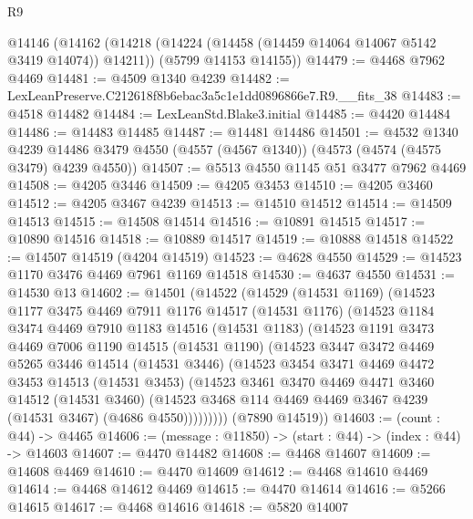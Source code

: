 \begin{lexlean}{R9}
\begin{coremodule}
  @14146
    (@14162
      (@14218 (@14224 (@14458 (@14459 @14064 @14067 @5142 @3419 @14074)) @14211))
      (@5799 @14153 @14155))
@14479 := @4468 @7962 @4469
@14481 := @4509 @1340 @4239
@14482 := LexLeanPreserve.C212618f8b6ebac3a5c1e1dd0896866e7.R9.__fits_38
@14483 := @4518 @14482
@14484 := LexLeanStd.Blake3.initial
@14485 := @4420 @14484
@14486 := @14483 @14485
@14487 := @14481 @14486
@14501 := @4532
    @1340
    @4239
    @14486
    @3479
    @4550
    (@4557 (@4567 @1340))
    (@4573 (@4574 (@4575 @3479) @4239 @4550))
@14507 := @5513 @4550 @1145 @51 @3477 @7962 @4469
@14508 := @4205 @3446
@14509 := @4205 @3453
@14510 := @4205 @3460
@14512 := @4205 @3467 @4239
@14513 := @14510 @14512
@14514 := @14509 @14513
@14515 := @14508 @14514
@14516 := @10891 @14515
@14517 := @10890 @14516
@14518 := @10889 @14517
@14519 := @10888 @14518
@14522 := @14507 @14519 (@4204 @14519)
@14523 := @4628 @4550
@14529 := @14523 @1170 @3476 @4469 @7961 @1169 @14518
@14530 := @4637 @4550
@14531 := @14530 @13
@14602 := @14501
    (@14522
      (@14529
        (@14531 @1169)
        (@14523
          @1177
          @3475
          @4469
          @7911
          @1176
          @14517
          (@14531 @1176)
          (@14523
            @1184
            @3474
            @4469
            @7910
            @1183
            @14516
            (@14531 @1183)
            (@14523
              @1191
              @3473
              @4469
              @7006
              @1190
              @14515
              (@14531 @1190)
              (@14523
                @3447
                @3472
                @4469
                @5265
                @3446
                @14514
                (@14531 @3446)
                (@14523
                  @3454
                  @3471
                  @4469
                  @4472
                  @3453
                  @14513
                  (@14531 @3453)
                  (@14523
                    @3461
                    @3470
                    @4469
                    @4471
                    @3460
                    @14512
                    (@14531 @3460)
                    (@14523 @3468 @114 @4469 @4469 @3467 @4239 (@14531 @3467) (@4686 @4550)))))))))
      (@7890 @14519))
@14603 := (count : @44) -> @4465
@14606 := (message : @11850) -> (start : @44) -> (index : @44) -> @14603
@14607 := @4470 @14482
@14608 := @4468 @14607
@14609 := @14608 @4469
@14610 := @4470 @14609
@14612 := @4468 @14610 @4469
@14614 := @4468 @14612 @4469
@14615 := @4470 @14614
@14616 := @5266 @14615
@14617 := @4468 @14616
@14618 := @5820 @14007

\end{coremodule}
\end{lexlean}
